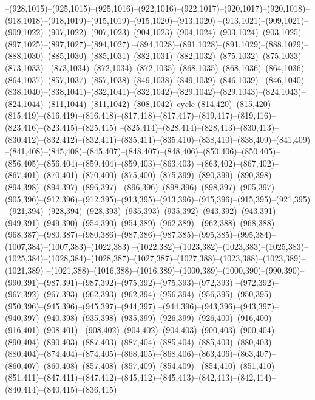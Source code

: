--(928,1015)--(925,1015)--(925,1016)--(922,1016)--(922,1017)--(920,1017)--(920,1018)--(918,1018)--(918,1019)--(915,1019)--(915,1020)--(913,1020)
--(913,1021)--(909,1021)--(909,1022)--(907,1022)--(907,1023)--(904,1023)--(904,1024)--(903,1024)--(903,1025)--(897,1025)--(897,1027)--(894,1027)
--(894,1028)--(891,1028)--(891,1029)--(888,1029)--(888,1030)--(885,1030)--(885,1031)--(882,1031)--(882,1032)--(875,1032)--(875,1033)--(873,1033)
--(873,1034)--(872,1034)--(872,1035)--(868,1035)--(868,1036)--(864,1036)--(864,1037)--(857,1037)--(857,1038)--(849,1038)--(849,1039)--(846,1039)
--(846,1040)--(838,1040)--(838,1041)--(832,1041)--(832,1042)--(829,1042)--(829,1043)--(824,1043)--(824,1044)--(811,1044)--(811,1042)--(808,1042)--cycle
(814,420)--(815,420)--(815,419)--(816,419)--(816,418)--(817,418)--(817,417)--(819,417)--(819,416)--(823,416)--(823,415)--(825,415)
--(825,414)--(828,414)--(828,413)--(830,413)--(830,412)--(832,412)--(832,411)--(835,411)--(835,410)--(838,410)--(838,409)--(841,409)
--(841,408)--(845,408)--(845,407)--(848,407)--(848,406)--(850,406)--(850,405)--(856,405)--(856,404)--(859,404)--(859,403)--(863,403)
--(863,402)--(867,402)--(867,401)--(870,401)--(870,400)--(875,400)--(875,399)--(890,399)--(890,398)--(894,398)--(894,397)--(896,397)
--(896,396)--(898,396)--(898,397)--(905,397)--(905,396)--(912,396)--(912,395)--(913,395)--(913,396)--(915,396)--(915,395)--(921,395)
--(921,394)--(928,394)--(928,393)--(935,393)--(935,392)--(943,392)--(943,391)--(949,391)--(949,390)--(954,390)--(954,389)--(962,389)
--(962,388)--(968,388)--(968,387)--(980,387)--(980,386)--(987,386)--(987,385)--(995,385)--(995,384)--(1007,384)--(1007,383)--(1022,383)
--(1022,382)--(1023,382)--(1023,383)--(1025,383)--(1025,384)--(1028,384)--(1028,387)--(1027,387)--(1027,388)--(1023,388)--(1023,389)--(1021,389)
--(1021,388)--(1016,388)--(1016,389)--(1000,389)--(1000,390)--(990,390)--(990,391)--(987,391)--(987,392)--(975,392)--(975,393)--(972,393)
--(972,392)--(967,392)--(967,393)--(962,393)--(962,394)--(956,394)--(956,395)--(950,395)--(950,396)--(945,396)--(945,397)--(944,397)
--(944,396)--(943,396)--(943,397)--(940,397)--(940,398)--(935,398)--(935,399)--(926,399)--(926,400)--(916,400)--(916,401)--(908,401)
--(908,402)--(904,402)--(904,403)--(900,403)--(900,404)--(890,404)--(890,403)--(887,403)--(887,404)--(885,404)--(885,403)--(880,403)
--(880,404)--(874,404)--(874,405)--(868,405)--(868,406)--(863,406)--(863,407)--(860,407)--(860,408)--(857,408)--(857,409)--(854,409)
--(854,410)--(851,410)--(851,411)--(847,411)--(847,412)--(845,412)--(845,413)--(842,413)--(842,414)--(840,414)--(840,415)--(836,415)
